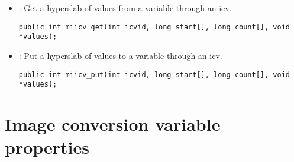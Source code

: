 \documentclass{article}
\begin{document}
\begin{itemize}
\item {} : Get a hyperslab of values from a variable
through an icv.
\begin{verbatim}
public int miicv_get(int icvid, long start[], long count[], void *values);
\end{verbatim}

\item {} : Put a hyperslab of values to a variable
through an icv.
\begin{verbatim}
public int miicv_put(int icvid, long start[], long count[], void *values);
\end{verbatim}

\end{itemize}

\section{Image conversion variable properties}
\end{document}
